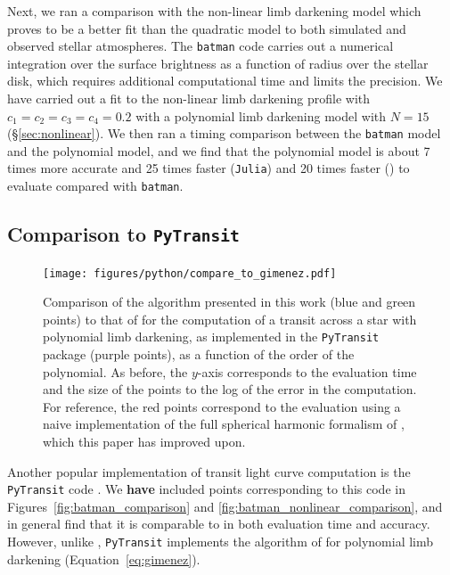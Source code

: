 \documentclass[modern,trackchanges]{aastex63}
\begin{document}
Next, we ran a comparison with the non-linear limb darkening model which
proves to be a better fit than the quadratic model to both simulated
and observed stellar atmospheres.  The \texttt{batman} code carries out
a numerical integration over the surface brightness as a function of
radius over the stellar disk, which requires additional computational
time and limits the precision.  We have carried out a fit to the
non-linear limb darkening profile with $c_1=c_2=c_3=c_4=0.2$ with a
polynomial limb darkening model with $N=15$ (\S \ref{sec:nonlinear}).  
We then ran a timing comparison between the \texttt{batman} model and the 
polynomial model, and we find that the polynomial model is about 7 times
more accurate and 25 times faster (\texttt{Julia})
and 20 times faster (\starry) to evaluate compared with \texttt{batman}.

\subsection{Comparison to \texttt{PyTransit}} \label{sec:comparison_pytransit}

\begin{figure}[t!]
    \begin{centering}
    \texttt{[image: figures/python/compare\_to\_gimenez.pdf]}
    \caption{Comparison of the algorithm presented in this work (blue and
             green points) to that of
             \citet{Gimenez2006} for the computation of a transit across a
             star with polynomial limb darkening, as implemented in the
             \texttt{PyTransit} package \citep{Parviainen2015b}
             (purple points), as a function
             of the order of the polynomial. As before, the $y$-axis
             corresponds to the evaluation time and the size of the points
             to the log of the error in the computation. For reference, the
             red points correspond to the evaluation using a naive implementation
             of the full spherical harmonic formalism of \citet{starry}, which
             this paper has improved upon.
    \label{fig:gimenez_comparison}}
    \end{centering}
\end{figure}

Another popular implementation of transit light curve computation is the
\texttt{PyTransit} code \citep{Parviainen2015b}. We {\bf have} included points corresponding
to this code in Figures~\ref{fig:batman_comparison} and \ref{fig:batman_nonlinear_comparison},
and in general find that it is comparable to \batman in both evaluation time
and accuracy. However, unlike \batman, \texttt{PyTransit} implements the
algorithm of \citet{Gimenez2006} for polynomial limb darkening (Equation~\ref{eq:gimenez}).
\end{document}
